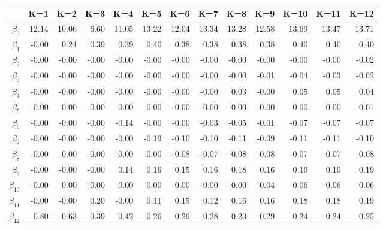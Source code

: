 \begin{table}[ht]
\centering
\begin{tabular}{rrrrrrrrrrrrr}
  \hline
 & K=1 & K=2 & K=3 & K=4 & K=5 & K=6 & K=7 & K=8 & K=9 & K=10 & K=11 & K=12 \\ 
  \hline
$\beta_{0}$ & 12.14 & 10.06 & 6.60 & 11.05 & 13.22 & 12.04 & 13.34 & 13.28 & 12.58 & 13.69 & 13.47 & 13.71 \\ 
  $\beta_{1}$ & -0.00 & 0.24 & 0.39 & 0.39 & 0.40 & 0.38 & 0.38 & 0.38 & 0.38 & 0.40 & 0.40 & 0.40 \\ 
  $\beta_{2}$ & -0.00 & -0.00 & -0.00 & -0.00 & -0.00 & -0.00 & -0.00 & -0.00 & -0.00 & -0.00 & -0.00 & -0.02 \\ 
  $\beta_{3}$ & -0.00 & -0.00 & -0.00 & -0.00 & -0.00 & -0.00 & -0.00 & -0.00 & -0.01 & -0.04 & -0.03 & -0.02 \\ 
  $\beta_{4}$ & -0.00 & -0.00 & -0.00 & -0.00 & -0.00 & -0.00 & -0.00 & 0.03 & -0.00 & 0.05 & 0.05 & 0.04 \\ 
  $\beta_{5}$ & -0.00 & -0.00 & -0.00 & -0.00 & -0.00 & -0.00 & -0.00 & -0.00 & -0.00 & -0.00 & 0.00 & 0.01 \\ 
  $\beta_{6}$ & -0.00 & -0.00 & -0.00 & -0.14 & -0.00 & -0.00 & -0.03 & -0.05 & -0.01 & -0.07 & -0.07 & -0.07 \\ 
  $\beta_{7}$ & -0.00 & -0.00 & -0.00 & -0.00 & -0.19 & -0.10 & -0.10 & -0.11 & -0.09 & -0.11 & -0.11 & -0.10 \\ 
  $\beta_{8}$ & -0.00 & -0.00 & -0.00 & -0.00 & -0.00 & -0.08 & -0.07 & -0.08 & -0.08 & -0.07 & -0.07 & -0.08 \\ 
  $\beta_{9}$ & -0.00 & -0.00 & -0.00 & 0.14 & 0.16 & 0.15 & 0.16 & 0.18 & 0.16 & 0.19 & 0.19 & 0.19 \\ 
  $\beta_{10}$ & -0.00 & -0.00 & -0.00 & -0.00 & -0.00 & -0.00 & -0.00 & -0.00 & -0.04 & -0.06 & -0.06 & -0.06 \\ 
  $\beta_{11}$ & -0.00 & -0.00 & 0.20 & -0.00 & 0.11 & 0.15 & 0.12 & 0.16 & 0.16 & 0.18 & 0.18 & 0.19 \\ 
  $\beta_{12}$ & 0.80 & 0.63 & 0.39 & 0.42 & 0.26 & 0.29 & 0.28 & 0.23 & 0.29 & 0.24 & 0.24 & 0.25 \\ 
   \hline
\end{tabular}
\end{table}
